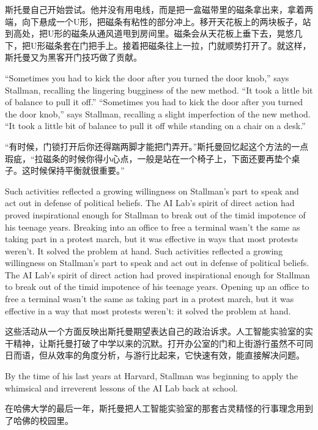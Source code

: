 \ifdefined\chs
斯托曼自己开始尝试。他并没有用电线，而是把一盒磁带里的磁条拿出来，拿着两端，向下悬成一个U形，把磁条有粘性的部分冲上。移开天花板上的两块板子，站到高处，把U形的磁条从通风道甩到房间里。磁条会从天花板上垂下去，晃悠几下，把U形磁条套在门把手上。接着把磁条往上一拉，门就顺势打开了。就这样，斯托曼又为黑客开门技巧做了贡献。
\fi

\ifdefined\eng
\ifdefined\vone
``Sometimes you had to kick the door after you turned the door knob,'' says Stallman, recalling the lingering bugginess of the new method. ``It took a little bit of balance to pull it off.''
\fi
\ifdefined\vtwo
``Sometimes you had to kick the door after you turned the door knob,'' says Stallman, recalling a slight imperfection of the new method. ``It took a little bit of balance to pull it off while standing on a chair on a desk.''
\fi
\fi

\ifdefined\chs
``有时候，门锁打开后你还得踹两脚才能把门弄开。''斯托曼回忆起这个方法的一点瑕疵，``拉磁条的时候你得小心点，一般是站在一个椅子上，下面还要再垫个桌子。这时候保持平衡就很重要。''
\fi

\ifdefined\eng
\ifdefined\vone
Such activities reflected a growing willingness on Stallman's part to speak and act out in defense of political beliefs. The AI Lab's spirit of direct action had proved inspirational enough for Stallman to break out of the timid impotence of his teenage years. Breaking into an office to free a terminal wasn't the same as taking part in a protest march, but it was effective in ways that most protests weren't. It solved the problem at hand.
\fi
\ifdefined\vtwo
Such activities reflected a growing willingness on Stallman's part to speak and act out in defense of political beliefs. The AI Lab's spirit of direct action had proved inspirational enough for Stallman to break out of the timid impotence of his teenage years. Opening up an office to free a terminal wasn't the same as taking part in a protest march, but it was effective in a way that most protests weren't: it solved the problem at hand.
\fi
\fi

\ifdefined\chs
这些活动从一个方面反映出斯托曼期望表达自己的政治诉求。人工智能实验室的实干精神，让斯托曼打破了中学以来的沉默。打开办公室的门和上街游行虽然不可同日而语，但从效率的角度分析，与游行比起来，它快速有效，能直接解决问题。
\fi

\ifdefined\eng
By the time of his last years at Harvard, Stallman was beginning to apply the whimsical and irreverent lessons of the AI Lab back at school.
\fi

\ifdefined\chs
在哈佛大学的最后一年，斯托曼把人工智能实验室的那套古灵精怪的行事理念用到了哈佛的校园里。
\fi

